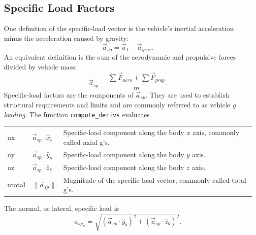 \subsection{Specific Load Factors}\label{sec:specific-load}

One definition of the specific-load vector is the vehicle's inertial acceleration minus
the acceleration caused by gravity:
\begin{equation}
  \vec a_{sp}=\vec a_I-\vec a_{grav}.
  \label{eq:specific-load-inertial-definition}
\end{equation}
An equivalent definition is the sum of the aerodynamic and propulsive forces divided
by vehicle mass:
\begin{equation}
  \vec a_{sp}
  =\frac{\sum\vec F_{aero}+\sum\vec F_{prop}}{m}.
  \label{eq:specific-load-force-definition}
\end{equation}
Specific-load factors are the components of $\vec a_{sp}$. They are used to establish
structural requirements and limits and are commonly referred to as vehicle
\emph{g loading}. The function \texttt{compute\_derivs} evaluates
\begin{longtable}{@{}>{\ttfamily}p{}p{}p{}@{}}
  nx & $\vec a_{sp}\mathbin{\cdot}\hat x_b$ &
    Specific-load component along the body $x$ axis, commonly called axial g's.\\
  ny & $\vec a_{sp}\mathbin{\cdot}\hat y_b$ &
    Specific-load component along the body $y$ axis.\\
  nz & $\vec a_{sp}\mathbin{\cdot}\hat z_b$ &
    Specific-load component along the body $z$ axis.\\
  ntotal & $\lVert\vec a_{sp}\rVert$ &
    Magnitude of the specific-load vector, commonly called total g's.\\
\end{longtable}
The normal, or lateral, specific load is
\begin{equation}
  a_{sp_n}
  =\sqrt{
    \left(\vec a_{sp}\mathbin{\cdot}\hat y_b\right)^2
    +\left(\vec a_{sp}\mathbin{\cdot}\hat z_b\right)^2
  }.
  \label{eq:normal-specific-load}
\end{equation}
